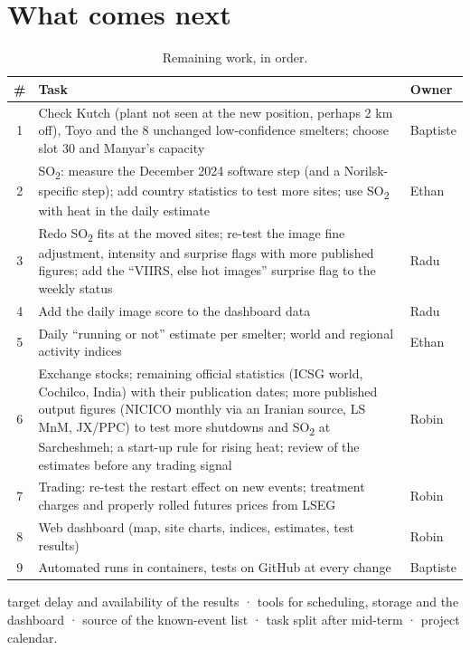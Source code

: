 \documentclass[10pt,a4paper]{article}
\newcommand{\SOtwo}{SO\textsubscript{2}}
\begin{document}
\section{What comes next}

\begin{table}[H]
\centering\small
\begin{tabularx}{\textwidth}{@{}c X >{\raggedright\arraybackslash}p{3.0cm}@{}}
\toprule
\textbf{\#} & \textbf{Task} & \textbf{Owner}\\
\midrule
1 & Check Kutch (plant not seen at the new position, perhaps 2 km off), Toyo and the 8 unchanged low-confidence smelters; choose slot 30 and Manyar's capacity & Baptiste\\
2 & \SOtwo: measure the December 2024 software step (and a Norilsk-specific step); add country statistics to test more sites; use \SOtwo{} with heat in the daily estimate & Ethan\\
3 & Redo \SOtwo{} fits at the moved sites; re-test the image fine adjustment, intensity and surprise flags with more published figures; add the ``VIIRS, else hot images'' surprise flag to the weekly status & Radu\\
4 & Add the daily image score to the dashboard data & Radu\\
5 & Daily ``running or not'' estimate per smelter; world and regional activity indices & Ethan\\
6 & Exchange stocks; remaining official statistics (ICSG world, Cochilco, India) with their publication dates; more published output figures (NICICO monthly via an Iranian source, LS MnM, JX/PPC) to test more shutdowns and \SOtwo{} at Sarcheshmeh; a start-up rule for rising heat; review of the estimates before any trading signal & Robin\\
7 & Trading: re-test the restart effect on new events; treatment charges and properly rolled futures prices from LSEG & Robin\\
8 & Web dashboard (map, site charts, indices, estimates, test results) & Robin\\
9 & Automated runs in containers, tests on GitHub at every change & Baptiste\\
\bottomrule
\end{tabularx}
\caption{Remaining work, in order.}
\end{table}

\begin{notebox}
target delay and availability of the results · tools for scheduling, storage and the dashboard · source of the known-event list · task split after mid-term · project calendar.
\end{notebox}
\end{document}
